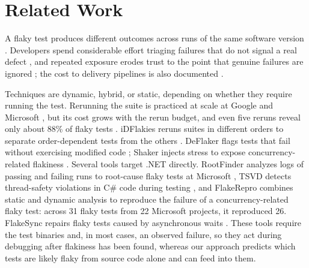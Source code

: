 \section{Related Work}
\label{sec:related}

 A flaky test produces different outcomes across runs of the same software version \cite{luo2014empirical, parry2021survey}. Developers spend considerable effort triaging failures that do not signal a real defect \cite{pinto2020vocabulary}, and repeated exposure erodes trust to the point that genuine failures are ignored \cite{gruber2022survey, rahman2018impact}; the cost to delivery pipelines is also documented \cite{herzig2015empirically, micco2017state}.

 Techniques are dynamic, hybrid, or static, depending on whether they require running the test. Rerunning the suite is practiced at scale at Google and Microsoft \cite{lam2020study, micco2017state}, but its cost grows with the rerun budget, and even five reruns reveal only about 88\% of flaky tests \cite{lam2020understanding}.  iDFlakies reruns suites in different orders to separate order-dependent tests from the others \cite{lam2019idflakies}. DeFlaker flags tests that fail without exercising modified code \cite{bell2018deflaker}; Shaker injects stress to expose concurrency-related flakiness \cite{silva2020shake}. Several tools target .NET directly. RootFinder analyzes logs of passing and failing runs to root-cause flaky tests at Microsoft \cite{lam2019root}, TSVD detects thread-safety violations in C\# code during testing \cite{li2019tsvd}, and FlakeRepro \cite{leesatapornwongsa2022flakerepro} combines static and dynamic analysis to reproduce the failure of a concurrency-related flaky test: across 31 flaky tests from 22 Microsoft projects, it reproduced 26. FlakeSync repairs flaky tests caused by asynchronous waits \cite{rahman2024flakesync}. These tools require the test binaries and, in most cases, an observed failure, so they act during debugging after flakiness has been found, whereas our approach predicts which tests are likely flaky from source code alone and can feed into them.

